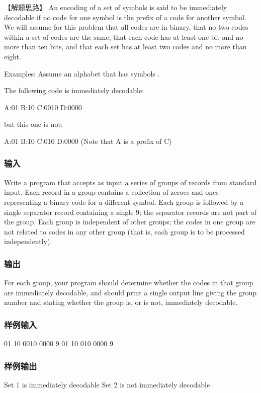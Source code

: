 【解题思路】
An encoding of a set of symbols is said to be immediately decodable if no code for one symbol is the prefix of a code for another symbol. We will assume for this problem that all codes are in binary, that no two codes within a set of codes are the same, that each code has at least one bit and no more than ten bits, and that each set has at least two codes and no more than eight. 

Examples: Assume an alphabet that has symbols .

The following code is immediately decodable: 
\begin{Code}
A:01 B:10 C:0010 D:0000 
\end{Code}

but this one is not: 
\begin{Code}
A:01 B:10 C:010 D:0000 (Note that A is a prefix of C) 
\end{Code}


\subsubsection{输入}
Write a program that accepts as input a series of groups of records from standard input. Each record in a group contains a collection of zeroes and ones representing a binary code for a different symbol. Each group is followed by a single separator record containing a single 9; the separator records are not part of the group. Each group is independent of other groups; the codes in one group are not related to codes in any other group (that is, each group is to be processed independently).


\subsubsection{输出}
For each group, your program should determine whether the codes in that group are immediately decodable, and should print a single output line giving the group number and stating whether the group is, or is not, immediately decodable.

\subsubsection{样例输入}
\begin{Code}
01
10
0010
0000
9
01
10
010
0000
9
\end{Code}

\subsubsection{样例输出}
\begin{Code}
Set 1 is immediately decodable
Set 2 is not immediately decodable
\end{Code}


